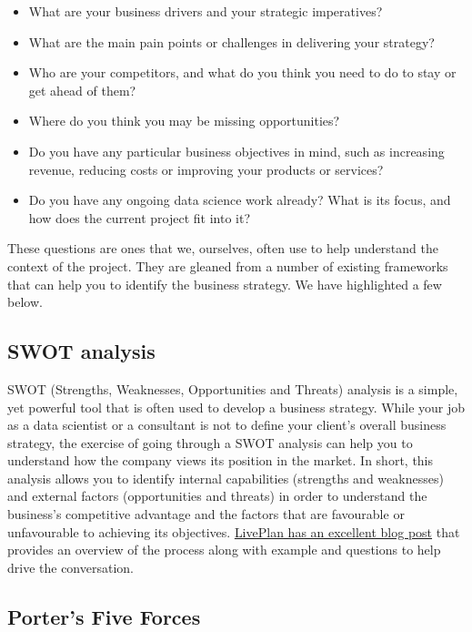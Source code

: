 \documentclass[
]{book}
\providecommand{\tightlist}{%
  \setlength{\itemsep}{0pt}\setlength{\parskip}{0pt}}
\begin{document}
\begin{itemize}
\tightlist
\item
  What are your business drivers and your strategic imperatives?
\item
  What are the main pain points or challenges in delivering your strategy?
\item
  Who are your competitors, and what do you think you need to do to stay or get ahead of them?
\item
  Where do you think you may be missing opportunities?
\item
  Do you have any particular business objectives in mind, such as increasing revenue, reducing costs or improving your products or services?
\item
  Do you have any ongoing data science work already? What is its focus, and how does the current project fit into it?
\end{itemize}

These questions are ones that we, ourselves, often use to help understand the context of the project. They are gleaned from a number of existing frameworks that can help you to identify the business strategy. We have highlighted a few below.

\hypertarget{swot-analysis}{%
\subsection{SWOT analysis}\label{swot-analysis}}

SWOT (Strengths, Weaknesses, Opportunities and Threats) analysis is a simple, yet powerful tool that is often used to develop a business strategy. While your job as a data scientist or a consultant is not to define your client's overall business strategy, the exercise of going through a SWOT analysis can help you to understand how the company views its position in the market. In short, this analysis allows you to identify internal capabilities (strengths and weaknesses) and external factors (opportunities and threats) in order to understand the business's competitive advantage and the factors that are favourable or unfavourable to achieving its objectives. \href{https://www.liveplan.com/blog/what-is-a-swot-analysis-and-how-to-do-it-right-with-examples/}{LivePlan has an excellent blog post} that provides an overview of the process along with example and questions to help drive the conversation.

\hypertarget{porters-five-forces}{%
\subsection{Porter's Five Forces}\label{porters-five-forces}}
\end{document}
